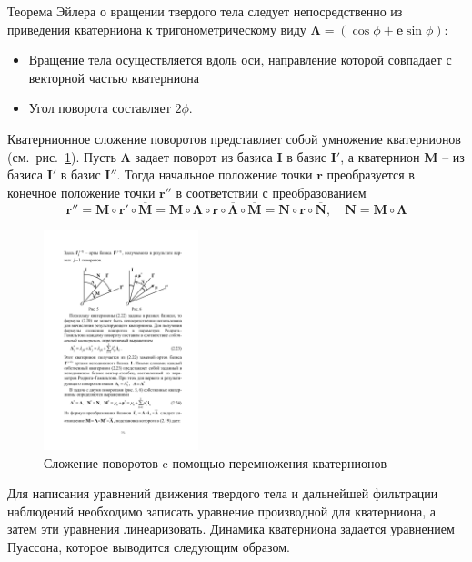 \documentclass{article}
\begin{document}
Теорема Эйлера о вращении твердого тела следует непосредственно из приведения
кватерниона к тригонометрическому виду
$\mathbf{\Lambda}=\left(\cos{\phi}+\mathbf{e}\sin{\phi}\right)$:
\begin{itemize}
\item Вращение тела осуществляется вдоль оси, направление которой совпадает с
    векторной частью кватерниона
\item Угол поворота составляет $2\phi$.
\end{itemize}
Кватернионное сложение поворотов представляет собой умножение кватернионов
(см.~рис.~\ref{fig:quat_multiply}). Пусть $\mathbf{\Lambda}$ задает поворот из
базиса $\mathbf{I}$ в базис $\mathbf{I}'$, а кватернион $\mathbf{M}$ -- из
базиса $\mathbf{I}'$ в базис $\mathbf{I}''$. Тогда начальное положение точки
$\mathbf{r}$ преобразуется в конечное положение точки $\mathbf{r}''$ в соответствии с
преобразованием
$$
\mathbf{r}'' = \mathbf{M}\circ\mathbf{r}'\circ\overline{\mathbf{M}} =
\mathbf{M}\circ\mathbf{\Lambda}\circ\mathbf{r}\circ\overline{\mathbf{\Lambda}}\circ\overline{\mathbf{M}}
= \mathbf{N}\circ\mathbf{r}\circ\overline{\mathbf{N}}, \quad \mathbf{N} =
\mathbf{M}\circ\mathbf{\Lambda}
$$
\begin{figure}
\centering
\includegraphics[width=0.4\textwidth]{pic/multiple_rotations.pdf}
\caption{\label{fig:quat_multiply}Сложение поворотов c помощью перемножения
кватернионов}
\end{figure}

Для написания уравнений движения твердого тела и дальнейшей фильтрации
наблюдений необходимо записать уравнение производной для кватерниона, а затем
эти уравнения линеаризовать. Динамика кватерниона задается уравнением
Пуассона, которое выводится следующим образом.
\end{document}
